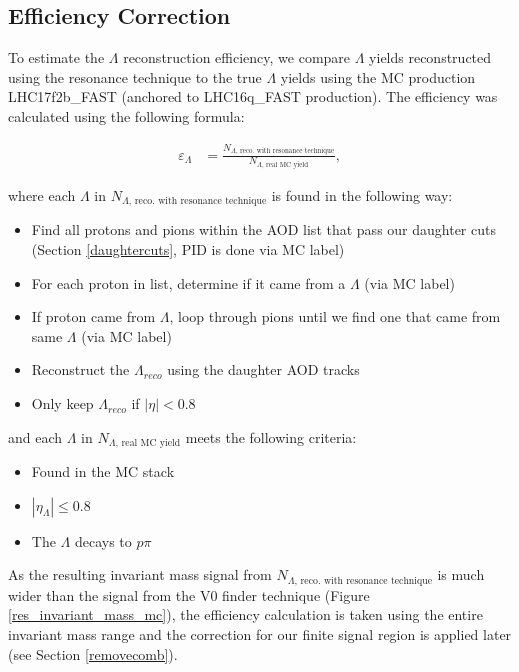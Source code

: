 \documentclass[ALICE,manyauthors]{ALICE_analysis_notes}
\begin{document}
\begin{itemize}
\subsection{Efficiency Correction}
To estimate the $\Lambda$ reconstruction efficiency, we compare $\Lambda$ yields reconstructed using the resonance technique to the true $\Lambda$ yields using the MC production LHC17f2b\_FAST (anchored to LHC16q\_FAST production). The efficiency was calculated using the following formula:

\begin{align*}
	\varepsilon_{\Lambda} &=  \frac{N_{\Lambda\text{, reco. with resonance technique}}}{N_{\Lambda\text{, real MC yield}}},
\end{align*}

where each $\Lambda$ in $N_{\Lambda\text{, reco. with resonance technique}}$ is found in the following way:

\begin{itemize}
	\item Find all protons and pions within the AOD list that pass our daughter cuts (Section \ref{daughtercuts}, PID is done via MC label)
	\item For each proton in list, determine if it came from a $\Lambda$ (via MC label)
	\item If proton came from $\Lambda$, loop through pions until we find one that came from same $\Lambda$ (via MC label)
	\item Reconstruct the $\Lambda_{reco}$ using the daughter AOD tracks
	\item Only keep $\Lambda_{reco}$ if $|\eta| < 0.8$
\end{itemize}

and each $\Lambda$ in $N_{\Lambda\text{, real MC yield}}$ meets the following criteria:

\begin{itemize}
	\item Found in the MC stack
	\item $|\eta_{\Lambda}| \leq 0.8$
	\item The $\Lambda$ decays to $p\pi$
\end{itemize}

As the resulting invariant mass signal from $N_{\Lambda\text{, reco. with resonance technique}}$ is much wider than the signal from the V0 finder technique (Figure \ref{res_invariant_mass_mc}), the efficiency calculation is taken using the entire invariant mass range and the correction for our finite signal region is applied later (see Section \ref{removecomb}).


\end{itemize}
\end{document}
